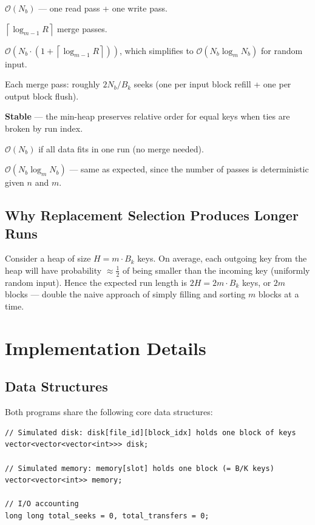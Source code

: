 \documentclass[12pt,a4paper]{article}
\newcommand{\bigO}[1]{\mathcal{O}\!\left(#1\right)}
\newcommand{\ceil}[1]{\left\lceil #1 \right\rceil}
\begin{document}
\begin{description}[noitemsep]
  \item[Phase 1 transfers:] $\bigO{N_b}$ — one read pass + one write pass.
  \item[Merge passes:] $\ceil{\log_{m-1} R}$ merge passes.
  \item[Total transfers:] $\bigO{N_b \cdot (1 + \ceil{\log_{m-1} R})}$,
    which simplifies to $\bigO{N_b \log_{m} N_b}$ for random input.
  \item[Total seeks:] Each merge pass: roughly $2 N_b / B_k$ seeks
    (one per input block refill + one per output block flush).
  \item[Stability:] \textbf{Stable} — the min-heap preserves relative order
    for equal keys when ties are broken by run index.
  \item[Best case:] $\bigO{N_b}$ if all data fits in one run (no merge needed).
  \item[Worst case:] $\bigO{N_b \log_{m} N_b}$ — same as expected,
    since the number of passes is deterministic given $n$ and $m$.
\end{description}

\subsection{Why Replacement Selection Produces Longer Runs}

Consider a heap of size $H = m \cdot B_k$ keys. On average, each outgoing key
from the heap will have probability $\approx \frac{1}{2}$ of being smaller than
the incoming key (uniformly random input). Hence the expected run length is
$2H = 2m \cdot B_k$ keys, or $2m$ blocks — double the naive approach of simply
filling and sorting $m$ blocks at a time.

\section{Implementation Details}

\subsection{Data Structures}

Both programs share the following core data structures:

\begin{lstlisting}[caption={Shared simulation infrastructure}]
// Simulated disk: disk[file_id][block_idx] holds one block of keys
vector<vector<vector<int>>> disk;

// Simulated memory: memory[slot] holds one block (= B/K keys)
vector<vector<int>> memory;

// I/O accounting
long long total_seeks = 0, total_transfers = 0;
\end{lstlisting}
\end{document}
